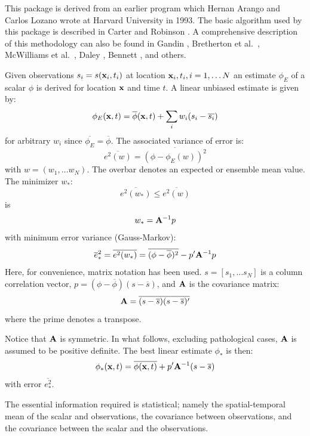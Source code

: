 This  package is derived from an earlier program which Hernan
Arango and Carlos Lozano wrote at Harvard University in 1993.   The
basic algorithm used by this package is described in Carter and
Robinson \cite{Carter87}.  A comprehensive description of this
methodology can also be found in Gandin \cite{Gandin63}, Bretherton et
al.\ \cite{Bretherton76}, McWilliams et al.\ \cite{McWilliams86}, Daley
\cite{Daley91}, Bennett \cite{Bennett92}, and others.

Given observations $s_i = s({\bf x}_i, t_i)$ at location ${\bf x}_i,
t_i, i = 1, \ldots N$ an estimate $\phi_E$ of a scalar $\phi$ is
derived for location ${\bf x}$ and time $t$.  A linear unbiased estimate
is given by:
\[
   \phi_E({\bf x}, t) = \overline{\phi}({\bf x},t) + \sum_i w_i (s_i -
   \overline{s_i})
\]
for arbitrary $w_i$ since $\overline{\phi_E} = \overline{\phi}$.  The
associated variance of error is:
\[
  \overline{e^2(w)} = \overline{(\phi - \phi_E(w))^2}
\]
with $w = (w_1, \ldots w_N)$.  The overbar denotes an expected or
ensemble mean value.  The minimizer $w_*$:
\[
   \overline{e^2 (w_*)} \leq \overline{e^2(w)}
\]
is
\[
   w_* = {\bf A}^{-1} p
\]
with minimum error variance (Gauss-Markov):
\[
   \overline{e}^2_* = \overline{e^2(w_*)} = \overline{(\phi -
   \overline{\phi})^2} - p' {\bf A}^{-1} p
\]
Here, for convenience, matrix notation has been used.  $s = [s_1, \ldots
s_N]$ is a column correlation vector, $p = (\phi - \overline{\phi})(s
- \overline{s})$, and ${\bf A}$ is the covariance matrix:
\[
   {\bf A} = \overline{(s - \overline{s})(s - \overline{s})'}
\]
where the prime denotes a transpose.

Notice that ${\bf A}$ is symmetric.  In what follows, excluding
pathological cases, ${\bf A}$ is assumed to be positive definite.
The best linear estimate $\phi_*$ is then:
\[
   \phi_*({\bf x}, t) = \overline{\phi({\bf x}, t)} + p' {\bf A}^{-1}
   (s - \overline{s})
\]
with error $\overline{e^2_*}$.

The essential information required is statistical; namely the
spatial-temporal mean of the scalar and observations, the covariance
between observations, and the covariance between the scalar and the
observations.

